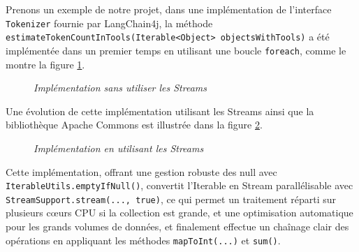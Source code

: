 \documentclass[12pt,a4paper]{report}
\begin{document}
	Prenons un exemple de notre projet, dans une implémentation de l'interface \verb|Tokenizer| fournie par LangChain4j, la méthode \\ \verb|estimateTokenCountInTools(Iterable<Object> objectsWithTools)| a été implémentée dans un premier temps en utilisant une boucle \verb|foreach|, comme le montre la figure \ref{fig:before-stream}.
	
	\begin{figure}[H]
		\centering
		\caption{\textit{Implémentation sans utiliser les Streams}}
		\label{fig:before-stream}
	\end{figure}
	
	Une évolution de cette implémentation utilisant les Streams ainsi que la bibliothèque Apache Commons est illustrée dans la figure \ref{fig:after-stream}.
	
	\begin{figure}[H]
		\centering
		\caption{\textit{Implémentation en utilisant les Streams}}
		\label{fig:after-stream}
	\end{figure}
	
	Cette implémentation, offrant une gestion robuste des null avec \\ \verb|IterableUtils.emptyIfNull()|, convertit l'Iterable en Stream parallélisable avec \\ \verb|StreamSupport.stream(..., true)|, ce qui permet un traitement réparti sur plusieurs cœurs CPU si la collection est grande, et une optimisation automatique pour les grands volumes de données, et finalement effectue un chaînage clair des opérations en appliquant les méthodes \verb|mapToInt(...)| et \verb|sum()|.
	
\end{document}
